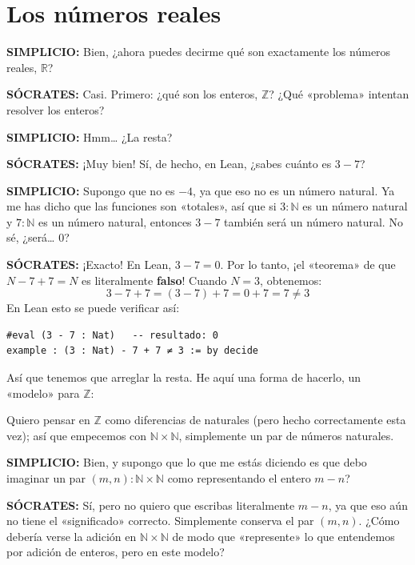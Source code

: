 \chapter{Los números reales}

\noindent\textbf{SIMPLICIO:} Bien, ¿ahora puedes decirme qué son exactamente los números reales, $\mathbb{R}$?

\medskip
\noindent\textbf{SÓCRATES:} Casi. Primero: ¿qué son los enteros, $\mathbb{Z}$? ¿Qué «problema» intentan resolver los enteros?

\medskip
\noindent\textbf{SIMPLICIO:} Hmm\ldots{} ¿La resta?

\medskip
\noindent\textbf{SÓCRATES:} ¡Muy bien! Sí, de hecho, en Lean, ¿sabes cuánto es $3 - 7$?

\medskip
\noindent\textbf{SIMPLICIO:} Supongo que no es $-4$, ya que eso no es un número natural. Ya me has dicho que las funciones son «totales», así que si $3 : \mathbb{N}$ es un número natural y $7 : \mathbb{N}$ es un número natural, entonces $3 - 7$ también será un número natural. No sé, ¿será\ldots{} $0$?

\medskip
\noindent\textbf{SÓCRATES:} ¡Exacto! En Lean, $3 - 7 = 0$. Por lo tanto, ¡el «teorema» de que $N - 7 + 7 = N$ es literalmente \textbf{falso}! Cuando $N = 3$, obtenemos:
\[
  3 - 7 + 7 = (3 - 7) + 7 = 0 + 7 = 7 \neq 3
\]
En Lean esto se puede verificar así:

\begin{verbatim}
#eval (3 - 7 : Nat)   -- resultado: 0
example : (3 : Nat) - 7 + 7 ≠ 3 := by decide
\end{verbatim}

Así que tenemos que arreglar la resta. He aquí una forma de hacerlo, un «modelo» para $\mathbb{Z}$:

Quiero pensar en $\mathbb{Z}$ como diferencias de naturales (pero hecho correctamente esta vez); así que empecemos con $\mathbb{N} \times \mathbb{N}$, simplemente un par de números naturales.

\medskip
\noindent\textbf{SIMPLICIO:} Bien, y supongo que lo que me estás diciendo es que debo imaginar un par $(m, n) : \mathbb{N} \times \mathbb{N}$ como representando el entero $m - n$?

\medskip
\noindent\textbf{SÓCRATES:} Sí, pero no quiero que escribas literalmente $m - n$, ya que eso aún no tiene el «significado» correcto. Simplemente conserva el par $(m, n)$. ¿Cómo debería verse la adición en $\mathbb{N} \times \mathbb{N}$ de modo que «represente» lo que entendemos por adición de enteros, pero en este modelo?

